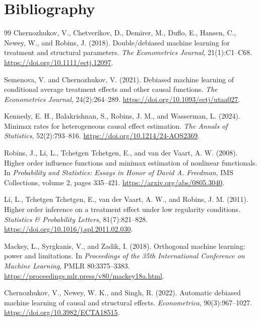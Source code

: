 \documentclass[11pt]{article}
\theoremstyle{definition}
\theoremstyle{plain}
\theoremstyle{remark}
\begin{document}
\section*{Bibliography}
\begin{thebibliography}{99}
Chernozhukov, V., Chetverikov, D., Demirer, M., Duflo, E., Hansen, C.,
Newey, W., and Robins, J. (2018).
Double/debiased machine learning for treatment and structural parameters.
\emph{The Econometrics Journal}, 21(1):C1--C68.
\url{https://doi.org/10.1111/ectj.12097}.

Semenova, V. and Chernozhukov, V. (2021).
Debiased machine learning of conditional average treatment effects and other
causal functions.
\emph{The Econometrics Journal}, 24(2):264--289.
\url{https://doi.org/10.1093/ectj/utaa027}.

Kennedy, E. H., Balakrishnan, S., Robins, J. M., and Wasserman, L. (2024).
Minimax rates for heterogeneous causal effect estimation.
\emph{The Annals of Statistics}, 52(2):793--816.
\url{https://doi.org/10.1214/24-AOS2369}.

Robins, J., Li, L., Tchetgen Tchetgen, E., and van der Vaart, A. W. (2008).
Higher order influence functions and minimax estimation of nonlinear
functionals.
In \emph{Probability and Statistics: Essays in Honor of David A. Freedman},
IMS Collections, volume 2, pages 335--421.
\url{https://arxiv.org/abs/0805.3040}.

Li, L., Tchetgen Tchetgen, E., van der Vaart, A. W., and Robins, J. M. (2011).
Higher order inference on a treatment effect under low regularity conditions.
\emph{Statistics \& Probability Letters}, 81(7):821--828.
\url{https://doi.org/10.1016/j.spl.2011.02.030}.

Mackey, L., Syrgkanis, V., and Zadik, I. (2018).
Orthogonal machine learning: power and limitations.
In \emph{Proceedings of the 35th International Conference on Machine
Learning}, PMLR 80:3375--3383.
\url{https://proceedings.mlr.press/v80/mackey18a.html}.

Chernozhukov, V., Newey, W. K., and Singh, R. (2022).
Automatic debiased machine learning of causal and structural effects.
\emph{Econometrica}, 90(3):967--1027.
\url{https://doi.org/10.3982/ECTA18515}.


\end{thebibliography}
\end{document}
